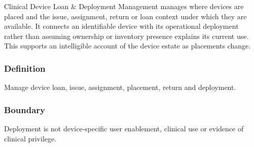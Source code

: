Clinical Device Loan \& Deployment Management manages where devices are placed and the issue, assignment, return or loan context under which they are available. It connects an identifiable device with its operational deployment rather than assuming ownership or inventory presence explains its current use. This supports an intelligible account of the device estate as placements change.

\subsubsection*{Definition}

Manage device loan, issue, assignment, placement, return and deployment.

\subsubsection*{Boundary}

Deployment is not device-specific user enablement, clinical use or evidence of clinical privilege.

